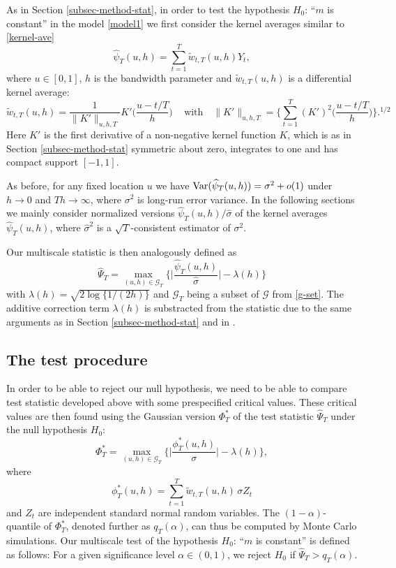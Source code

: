 \documentclass[a4paper,12pt]{article}
\numberwithin{equation}{section}
\begin{document}
As in Section \ref{subsec-method-stat}, in order to test the hypothesis $H_0$: ``$m$ is constant'' in the model \eqref{model1} we first consider the kernel averages similar to \eqref{kernel-ave}
\begin{equation}\label{kernel-ave-shape}
\widehat{\psi}_T(u,h) = \sum\limits_{t=1}^T \widetilde{w}_{t,T}(u,h) Y_t, 
\end{equation}
where $u\in [0,1]$, $h$ is the bandwidth parameter and $\widetilde{w}_{t,T}(u,h)$ is a differential kernel average: 
\[ \widetilde{w}_{t,T}(u,h) = \frac{1}{\|K'\|_{u,h,T}} K'\Big( \frac{u - t/T}{h} \Big) \, \quad \text{with} \quad \|K'\|_{u,h,T} = \Big\{\sum\limits_{t=1}^T  (K')^2\Big( \frac{u - t/T}{h} \Big)\Big\}.^{1/2} \]
Here $K'$ is the first derivative of a non-negative kernel function $K$, which is as in Section \ref{subsec-method-stat} symmetric about zero, integrates to one and has compact support $[-1,1]$.

As before, for any fixed location $u$ we have $\textnormal{Var}(\widehat{\psi}_T(u,h)) = \sigma^2 + o(1)$ under $h \rightarrow 0$ and $Th \rightarrow \infty$, where $\sigma^2$ is long-run error variance. In the following sections we mainly consider normalized versions $\widehat{\psi}_T(u,h)/\widehat{\sigma}$ of the kernel averages $\widehat{\psi}_T(u,h)$, where $\widehat{\sigma}^2$ is a $\sqrt{T}$-consistent estimator of $\sigma^2$.

Our multiscale statistic is then analogously defined as 
\[ \widehat{\Psi}_T = \max_{(u,h) \in \mathcal{G}_T} \Big\{ \Big|\frac{\widehat{\psi}_T(u,h)}{\widehat{\sigma}}\Big| - \lambda(h) \Big\} \] 
with $\lambda(h) = \sqrt{2 \log \{ 1/(2h) \}}$ and $\mathcal{G}_T$ being a subset of $\mathcal{G}$ from \eqref{g-set}. The additive correction term $\lambda(h)$ is substracted from the statistic due to the same arguments as in Section \ref{subsec-method-stat} and in \cite{DuembgenSpokoiny2001}.


\subsection{The test procedure}\label{subsec-test-shape-test}

In order to be able to reject our null hypothesis, we need to be able to compare test statistic developed above with some prespecified critical values. These critical values are then found using the Gaussian version $\Phi_T^*$ of the test statistic $\widehat{\Psi}_T$ under the null hypothesis $H_0$:
\[ \Phi_T^* = \max_{(u,h) \in \mathcal{G}_T} \Big\{ \Big|\frac{\phi_T^*(u,h)}{\sigma}\Big| - \lambda(h) \Big\}, \] 
where
\[ \phi_T^*(u,h) = \sum\limits_{t=1}^T \tilde{w}_{t,T}(u,h) \, \sigma Z_t \]
and $Z_t$ are independent standard normal random variables. The $(1-\alpha)$-quantile of $\Phi_T^*$, denoted further as $q_T(\alpha)$, can thus be computed by Monte Carlo simulations. Our multiscale test of the hypothesis $H_0$: ``$m$ is constant'' is defined as follows: For a given significance level $\alpha \in (0,1)$, we reject $H_0$ if $\widehat{\Psi}_T > q_T(\alpha)$. 
\end{document}
